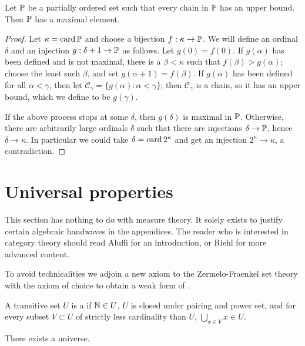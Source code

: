 \begin{theorem}
Let $\mathbb{P}$ be a partially ordered set such that every chain in $\mathbb{P}$ has an upper bound.
Then $\mathbb{P}$ has a maximal element.
\end{theorem}
\begin{proof}
Let $\kappa = \operatorname{card} \mathbb{P}$ and choose a bijection $f: \kappa \to \mathbb{P}$.
We will define an ordinal $\delta$ and an injection $g: \delta + 1 \to \mathbb{P}$ as follows.
Let $g(0) = f(0)$. If $g(\alpha)$ has been defined and is not maximal, there is a $\beta < \kappa$ such that $f(\beta) > g(\alpha)$; choose the least such $\beta$, and set $g(\alpha + 1) = f(\beta)$.
If $g(\alpha)$ has been defined for all $\alpha < \gamma$, then let $\mathcal C_{\gamma} = \{g(\alpha): \alpha < \gamma\}$; then $\mathcal C_\gamma$ is a chain, so it has an upper bound, which we define to be $g(\gamma)$.

If the above process stops at some $\delta$, then $g(\delta)$ is maximal in $\mathbb{P}$.
Otherwise, there are arbitrarily large ordinals $\delta$ such that there are injections $\delta \to \mathbb{P}$, hence $\delta \to \kappa$.
In particular we could take $\delta = \operatorname{card} 2^\kappa$ and get an injection $2^{\kappa} \to \kappa$, a contradiction.
\end{proof}

\section{Universal properties}
This section has nothing to do with measure theory.
It solely exists to justify certain algebraic handwaves in the appendices.
The reader who is interested in category theory should read Aluffi \cite{aluffi2009algebra} for an introduction, or Riehl \cite{riehl2017category} for more advanced content.

\begin{subsec}
To avoid technicalities we adjoin a new axiom to the Zermelo-Fraenkel set theory with the axiom of choice to obtain a weak form of .
\end{subsec}

\begin{definition}
A transitive set $U$ is a  if $\mathbb{N} \in U$, $U$ is closed under pairing and power set, and for every subset $V \subset U$ of strictly less cardinality than $U$, $\bigcup_{x \in V} x \in U$.
\end{definition}

\begin{axiom}[universe]
There exists a universe.
\end{axiom}


